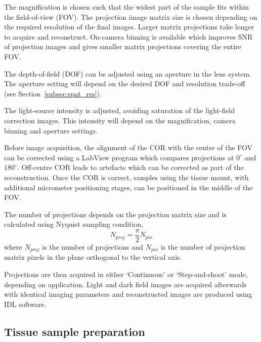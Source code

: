 The magnification is chosen such that the widest part of the sample fits within the  field-of-view (FOV). The projection image matrix size is chosen depending on the required resolution of the final images. Larger matrix projections take longer to acquire and reconstruct. On-camera binning is available which improves SNR of projection images and gives smaller matrix projections covering the entire FOV.

The depth-of-field (DOF) can be adjusted using an aperture in the lens system. The aperture setting will depend on the desired DOF and resolution trade-off (see Section~\ref{subsec:spat_res}).

The light-source intensity is adjusted, avoiding saturation of the  light-field correction images. This intensity will depend on the magnification, camera binning and aperture settings. 

Before image acquisition, the alignment of the COR with the centre of the FOV can be corrected using a LabView program which compares projections at $0^{\circ}$ and $180^{\circ}$. Off-centre COR leads to artefacts which can be corrected as part of the reconstruction. 
Once the COR is correct, samples using the tissue mount, with additional micrometer positioning stages, can  be positioned in the middle of the FOV.

The number of projections depends on the projection matrix size and is calculated using Nyquist sampling condition,
\begin{equation}
N_{proj} = \frac{\pi}{2} N_{pix}
\end{equation} 
where $N_{proj}$ is the number of projections and $N_{pix}$ is the number of projection matrix pixels in the plane orthogonal to the vertical axis.


Projections are then acquired in either `Continuous' or `Step-and-shoot' mode, depending on application. Light and dark field images are acquired afterwards with identical imaging parameters and reconstructed images are produced using IDL software. 








\subsection{Tissue sample preparation}



